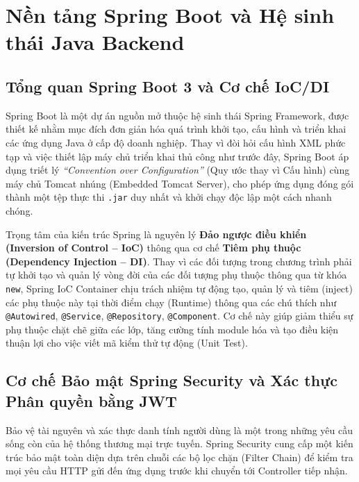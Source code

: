 \documentclass{uetgraduation}
\begin{document}
\section{Nền tảng Spring Boot và Hệ sinh thái Java Backend}
\subsection{Tổng quan Spring Boot 3 và Cơ chế IoC/DI}
Spring Boot là một dự án nguồn mở thuộc hệ sinh thái Spring Framework, được thiết kế nhằm mục đích đơn giản hóa quá trình khởi tạo, cấu hình và triển khai các ứng dụng Java ở cấp độ doanh nghiệp. Thay vì đòi hỏi cấu hình XML phức tạp và việc thiết lập máy chủ triển khai thủ công như trước đây, Spring Boot áp dụng triết lý \textit{``Convention over Configuration''} (Quy ước thay vì Cấu hình) cùng máy chủ Tomcat nhúng (Embedded Tomcat Server), cho phép ứng dụng đóng gói thành một tệp thực thi \texttt{.jar} duy nhất và khởi chạy độc lập một cách nhanh chóng.

Trọng tâm của kiến trúc Spring là nguyên lý \textbf{Đảo ngược điều khiển (Inversion of Control -- IoC)} thông qua cơ chế \textbf{Tiêm phụ thuộc (Dependency Injection -- DI)}. Thay vì các đối tượng trong chương trình phải tự khởi tạo và quản lý vòng đời của các đối tượng phụ thuộc thông qua từ khóa \texttt{new}, Spring IoC Container chịu trách nhiệm tự động tạo, quản lý và tiêm (inject) các phụ thuộc này tại thời điểm chạy (Runtime) thông qua các chú thích như \texttt{@Autowired}, \texttt{@Service}, \texttt{@Repository}, \texttt{@Component}. Cơ chế này giúp giảm thiểu sự phụ thuộc chặt chẽ giữa các lớp, tăng cường tính module hóa và tạo điều kiện thuận lợi cho việc viết mã kiểm thử tự động (Unit Test).

\subsection{Cơ chế Bảo mật Spring Security và Xác thực Phân quyền bằng JWT}
Bảo vệ tài nguyên và xác thực danh tính người dùng là một trong những yêu cầu sống còn của hệ thống thương mại trực tuyến. Spring Security cung cấp một kiến trúc bảo mật toàn diện dựa trên chuỗi các bộ lọc chặn (Filter Chain) để kiểm tra mọi yêu cầu HTTP gửi đến ứng dụng trước khi chuyển tới Controller tiếp nhận.
\end{document}
